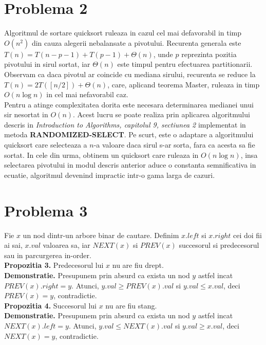 \documentclass[12pt]{article}
\begin{document}
\section*{Problema 2}
Algoritmul de sortare quicksort ruleaza in cazul cel mai defavorabil in timp $O(n^2)$ din cauza alegerii nebalansate a pivotului. Recurenta generala este $T(n) = T(n - p - 1) + T(p - 1) + \Theta(n)$, unde $p$ reprezinta pozitia pivotului in sirul sortat, iar $\Theta(n)$ este timpul pentru efectuarea partitionarii. Observam ca daca pivotul ar coincide cu mediana sirului, recurenta se reduce la $T(n) = 2T([n/2]) + \Theta(n)$, care, aplicand teorema Master, ruleaza in timp $O(n \log{n})$ in cel mai nefavorabil caz. \\
Pentru a atinge complexitatea dorita este necesara determinarea medianei unui sir nesortat in $O(n)$. Acest lucru se poate realiza prin aplicarea algoritmului descris in \textit{Introduction to Algorithms, capitolul 9, sectiunea 2} implementat in metoda \textbf{RANDOMIZED-SELECT}. Pe scurt, este o adaptare a algoritmului quicksort care selecteaza a $n$-a valoare daca sirul s-ar sorta, fara ca acesta sa fie sortat.
In cele din urma, obtinem un quicksort care ruleaza in $O(n \log{n})$, insa selectarea pivotului in modul descris anterior aduce o constanta semnificativa in ecuatie, algoritmul devenind impractic intr-o gama larga de cazuri.

\section*{Problema 3}

Fie $x$ un nod dintr-un arbore binar de cautare. Definim $x.left$ si $x.right$ cei doi fii ai sai, $x.val$ valoarea sa, iar $NEXT(x)$ si $PREV(x)$ succesorul si predecesorul sau in parcurgerea in-order. \\

\textbf{Propozitia 3.} Predecesorul lui $x$ nu are fiu drept. \\
\textbf{Demonstratie.} Presupunem prin absurd ca exista un nod $y$ astfel incat $PREV(x).right = y$. Atunci, $y.val \geq PREV(x).val$ si $y.val \leq x.val$, deci $PREV(x) = y$, contradictie. \\

\textbf{Propozitia 4.} Succesorul lui $x$ nu are fiu stang. \\
\textbf{Demonstratie.} Presupunem prin absurd ca exista un nod $y$ astfel incat $NEXT(x).left = y$. Atunci, $y.val \leq NEXT(x).val$ si $y.val \geq x.val$, deci $NEXT(x) = y$, contradictie. \\
\end{document}
